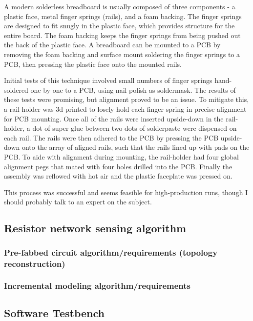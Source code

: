 \documentclass[11pt, a4paper]{article}
\begin{document}
A modern solderless breadboard is usually composed of three components - a plastic face, metal finger springs (rails), and a foam backing.
The finger springs are designed to fit snugly in the plastic face, which provides structure for the entire board.
The foam backing keeps the finger springs from being pushed out the back of the plastic face.
A breadboard can be mounted to a PCB by removing the foam backing and surface mount soldering the finger springs to a PCB, then pressing the plastic face onto the mounted rails.

Initial tests of this technique involved small numbers of finger springs hand-soldered one-by-one to a PCB, using nail polish as soldermask.
The results of these tests were promising, but alignment proved to be an issue.
To mitigate this, a rail-holder was 3d-printed to losely hold each finger spring in precise alignment for PCB mounting.
Once all of the rails were inserted upside-down in the rail-holder, a dot of super glue between two dots of solderpaste were dispensed on each rail.
The rails were then adhered to the PCB by pressing the PCB upside-down onto the array of aligned rails, such that the rails lined up with pads on the PCB. 
To aide with alignment during mounting, the rail-holder had four global alignment pegs that mated with four holes drilled into the PCB.
Finally the assembly was reflowed with hot air and the plastic faceplate was pressed on.

This process was successful and seems feasible for high-production runs, though I should probably talk to an expert on the subject.

\subsection{Resistor network sensing algorithm}

\subsubsection{Pre-fabbed circuit algorithm/requirements (topology reconstruction)}

\subsubsection{Incremental modeling algorithm/requirements}

\subsection{Software Testbench}
\end{document}
